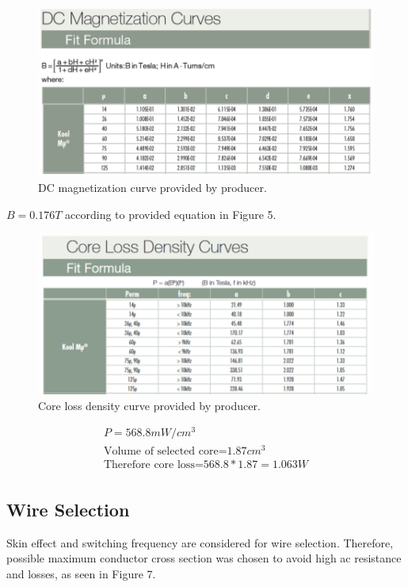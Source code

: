 \documentclass{article}
\begin{document}
 
 \begin{figure}[H]
     \centering
     \includegraphics[scale=0.7]{z1.png}
     \caption{DC magnetization curve provided by producer.}
     \label{fig:my_label}
 \end{figure}
 
 
 $B=0.176T$ according to provided equation in Figure 5. 
 
 
 
 
  \begin{figure}[H]
     \centering
     \includegraphics[scale=0.7]{z2.png}
     \caption{Core loss density curve provided by producer.}
     \label{fig:my_label}
 \end{figure}
 \begin{gather*}
      P=568.8 mW/cm^3\\
    \text{Volume of selected core=}1.87 cm^3\\
    \text{Therefore core loss=}568.8*1.87=1.063W\\
 \end{gather*}

 
 
 
 
 \newpage
 
 
 \subsection{Wire Selection}
 Skin effect and switching frequency are considered for wire selection. Therefore, possible maximum conductor cross section was chosen to avoid high ac resistance and losses, as seen in Figure 7.
 
\end{document}
